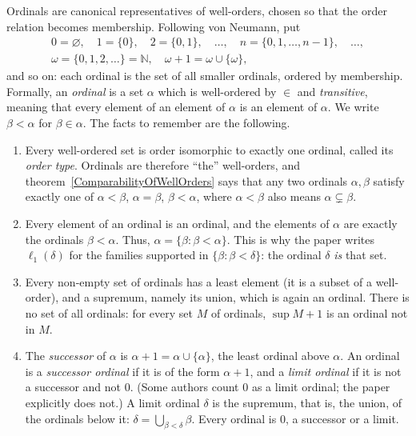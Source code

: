 \documentclass[12pt]{article}
\theoremstyle{definition}
\theoremstyle{remark}
\newcommand{\ellone}[1]{\ell_1(#1)}
\newcommand{\NN}{\mathbb{N}}
\begin{document}
Ordinals are canonical representatives of well-orders, chosen so that the
order relation becomes membership. Following von Neumann, put
\begin{gather*}
0=\varnothing,\quad 1=\{0\},\quad 2=\{0,1\},\quad\ldots,\quad
n=\{0,1,\ldots,n-1\},\quad\ldots,\\
\omega=\{0,1,2,\ldots\}=\NN,\quad \omega+1=\omega\cup\{\omega\},
\end{gather*}
and so on: each ordinal is the set of all smaller ordinals, ordered by
membership. Formally, an \emph{ordinal} is a set $\alpha$ which is well-ordered
by $\in$ and \emph{transitive}, meaning that every element of an element of
$\alpha$ is an element of $\alpha$. We write $\beta<\alpha$ for
$\beta\in\alpha$. The facts to remember are the following.
\begin{enumerate}[label = (\alph*)]
    \item Every well-ordered set is order isomorphic to exactly one ordinal,
          called its \emph{order type}. Ordinals are therefore ``the''
          well-orders, and theorem~\ref{ComparabilityOfWellOrders} says that
          any two ordinals $\alpha,\beta$ satisfy exactly one of
          $\alpha<\beta$, $\alpha=\beta$, $\beta<\alpha$, where $\alpha<\beta$
          also means $\alpha\subsetneq\beta$.
    \item Every element of an ordinal is an ordinal, and the elements of
          $\alpha$ are exactly the ordinals $\beta<\alpha$. Thus,
          $\alpha=\{\beta:\beta<\alpha\}$. This is why the paper writes
          $\ellone{\delta}$ for the families supported in
          $\{\beta:\beta<\delta\}$: the ordinal $\delta$ \emph{is} that set.
    \item Every non-empty set of ordinals has a least element (it is a subset of a
          well-order), and a supremum, namely its union, which is again an
          ordinal. There is no set of all ordinals: for every set $M$ of
          ordinals, $\sup M+1$ is an ordinal not in $M$.
    \item The \emph{successor} of $\alpha$ is $\alpha+1=\alpha\cup\{\alpha\}$,
          the least ordinal above $\alpha$. An ordinal is a \emph{successor
          ordinal} if it is of the form $\alpha+1$, and a \emph{limit
          ordinal} if it is not a successor and not $0$. (Some authors count
          $0$ as a limit ordinal; the paper explicitly does not.) A limit
          ordinal $\delta$ is the supremum, that is, the union, of the ordinals
          below it: $\delta=\bigcup_{\beta<\delta}\beta$. Every ordinal is
          $0$, a successor or a limit.
\end{enumerate}
\end{document}
